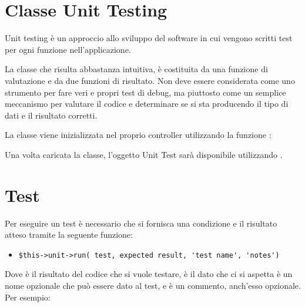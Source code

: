 \section{Classe Unit Testing}
\label{class:unittest}

Unit testing è un approccio allo sviluppo del software in cui vengono scritti test per ogni funzione nell'applicazione. 


La classe che risulta abbastanza intuitiva, è costituita da una funzione di valutazione e da due funzioni di risultato. Non deve essere considerata come uno strumento per fare veri e propri test di debug, ma piuttosto come un semplice meccanismo per valutare il codice e determinare se si sta producendo il tipo di dati e il risultato corretti.

La classe viene inizializzata nel proprio controller utilizzando la funzione :


Una volta caricata la classe, l'oggetto Unit Test sarà disponibile utilizzando .

\section*{Test}

Per eseguire un test è necessario che si fornisca una condizione e il risultato atteso tramite la seguente funzione:

\begin{itemize}
\item \verb|$this->unit->run( test, expected result, 'test name', 'notes')|
\end{itemize}

Dove  è il risultato del codice che si vuole testare,  è il dato che ci si aspetta  è un nome opzionale che può essere dato al test, e  è un commento, anch'esso opzionale. Per esempio:


